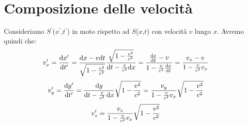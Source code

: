 \section{Composizione delle velocit\`a}
Consideriamo
$S^{\prime}$($x^{\prime}$,$t^{\prime}$) in moto rispetto ad
$S$($x$,$t$) con velocit\`a $v$ lungo $x$. Avremo quindi che:
\begin{displaymath}
  v^{\prime}_{x}=\frac{\mathrm{d} x^{\prime}}{\mathrm{d} t^{\prime}}=\frac{\mathrm{d}
    x-v\mathrm{d}
    t}{\sqrt{1-\frac{v^{2}}{c^{2}}}}\frac{\sqrt{1-\frac{v^{2}}{c^{2}}}}{\mathrm{d}
    t-\frac{v}{c^{2}}\mathrm{d} x}=\frac{\frac{\mathrm{d} x}{\mathrm{d}
      t}-v}{1-\frac{v}{c^{2}}\frac{\mathrm{d} x}{\mathrm{d}
      t}}=\frac{v_{x}-v}{1-\frac{v}{c^{2}}v_{x}}
\end{displaymath}
\begin{displaymath}
  v^{\prime}_{y}=\frac{\mathrm{d} y^{\prime}}{\mathrm{d} t^{\prime}}=\frac{\mathrm{d}
    y}{\mathrm{d} t-\frac{v}{c^{2}} \, \mathrm{d}
    x}\sqrt{1-\frac{v^{2}}{c^{2}}}=\frac{v_{y}}{1-\frac{v}{c^{2}}v_{x}}\sqrt{1-\frac{v^{2}}{c^{2}}}
\end{displaymath}
\begin{displaymath}
  v^{\prime}_{z}=\frac{v_{z}}{1-\frac{v}{c^{2}}v_{x}}\sqrt{1-\frac{v^{2}}{c^{2}}}
\end{displaymath}

